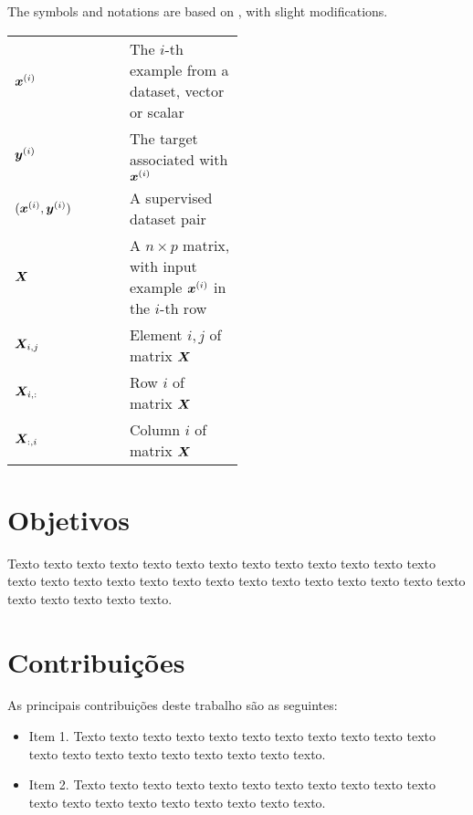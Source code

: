 The symbols and notations are based on \cite{Goodfellow-et-al-2016}, with slight modifications.

\begin{center}
\begin{tabular}{l p{0.5\linewidth}}
$\bm{x}^{(i)}$ & The $i$-th example from a dataset, vector or scalar\\
$\bm{y}^{(i)}$ & The target associated with $\bm{x}^{(i)}$\\
$(\bm{x}^{(i)},\bm{y}^{(i)})$ & A supervised dataset pair\\
$\bm{X}$ & A $n \times p$ matrix, with input example $\bm{x}^{(i)}$ in the $i$-th row\\
$\bm{X}_{i,j}$ & Element $i, j$ of matrix $\bm{X}$ \\
$\bm{X}_{i, :}$ & Row $i$ of matrix  $\bm{X}$ \\
$\bm{X}_{:, i}$ & Column $i$ of matrix $\bm{X}$ \\
\end{tabular}
\end{center}


\section{Objetivos}
\label{sec:objetivo}

Texto texto texto texto texto texto texto texto texto texto texto texto texto
texto texto texto texto texto texto texto texto texto texto texto texto texto
texto texto texto texto texto texto.

\section{Contribuições}
\label{sec:contribucoes}

As principais contribuições deste trabalho são as seguintes:

\begin{itemize}
  \item Item 1. Texto texto texto texto texto texto texto texto texto texto
  texto texto texto texto texto texto texto texto texto texto.

  \item Item 2. Texto texto texto texto texto texto texto texto texto texto
  texto texto texto texto texto texto texto texto texto texto.

\end{itemize}

